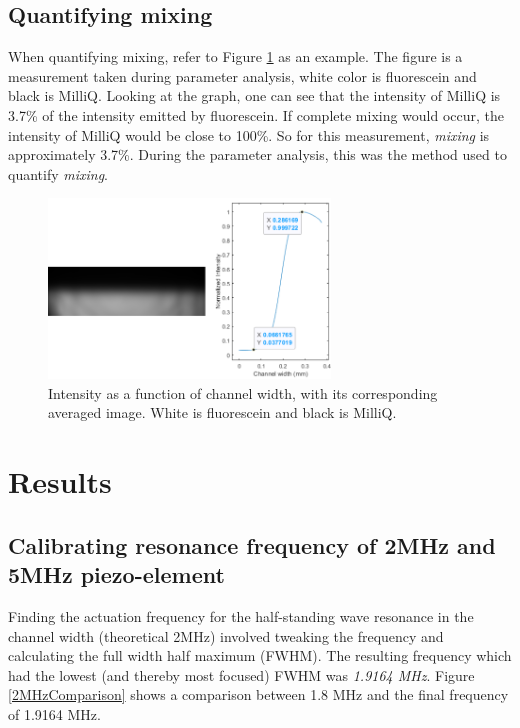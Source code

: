 \documentclass[twoside,twocolumn,9pt,a4paper]{IEEEtran}
\begin{document}
\subsection{Quantifying mixing}
\label{CAQ}

When quantifying mixing, refer to Figure \ref{mixing calc example} as an example. The figure is a measurement taken during parameter analysis, white color is fluorescein and black is MilliQ. Looking at the graph, one can see that the intensity of MilliQ is 3.7\% of the intensity emitted by fluorescein. If complete mixing would occur, the intensity of MilliQ would be close to 100\%. So for this measurement, \textit{mixing} is approximately 3.7\%. During the parameter analysis, this was the method used to quantify \textit{mixing}.

\begin{figure}[H]
\begin{center}
\includegraphics[width=7.5cm]{Images/mixing calc example.png} %
\caption{Intensity as a function of channel width, with its corresponding averaged image. White is fluorescein and black is MilliQ.}
\label{mixing calc example}
\end{center}
\end{figure} %




\section{Results} 

\subsection{Calibrating resonance frequency of 2MHz and 5MHz piezo-element}
Finding the actuation frequency for the half-standing wave resonance in the channel width (theoretical 2MHz) involved tweaking the frequency and calculating the full width half maximum (FWHM). The resulting frequency which had the lowest (and thereby most focused) FWHM was \textit{1.9164 MHz}. Figure \ref{2MHzComparison} shows a comparison between 1.8 MHz and the final frequency of 1.9164 MHz. 
\end{document}
